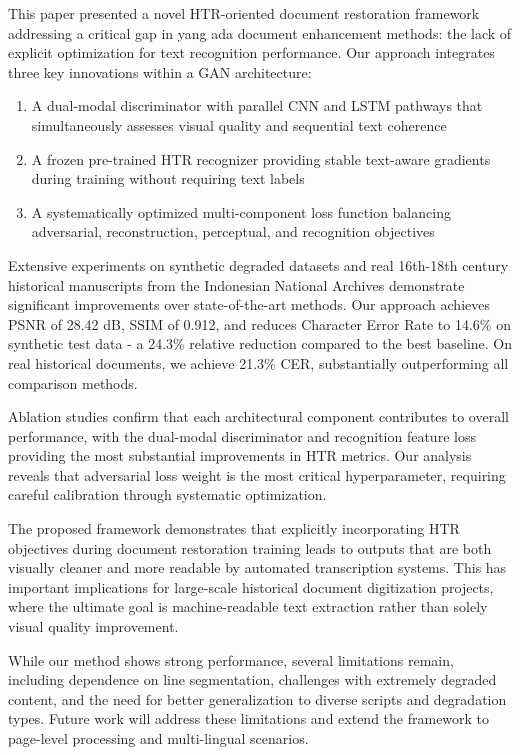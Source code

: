 \documentclass[journal]{IEEEtran}
\begin{document}
This paper presented a novel HTR-oriented document restoration framework addressing a critical gap in yang ada document enhancement methods: the lack of explicit optimization for text recognition performance. Our approach integrates three key innovations within a GAN architecture:

\begin{enumerate}
    \item A dual-modal discriminator with parallel CNN and LSTM pathways that simultaneously assesses visual quality and sequential text coherence
    \item A frozen pre-trained HTR recognizer providing stable text-aware gradients during training without requiring text labels
    \item A systematically optimized multi-component loss function balancing adversarial, reconstruction, perceptual, and recognition objectives
\end{enumerate}

Extensive experiments on synthetic degraded datasets and real 16th-18th century historical manuscripts from the Indonesian National Archives demonstrate significant improvements over state-of-the-art methods. Our approach achieves PSNR of 28.42 dB, SSIM of 0.912, and reduces Character Error Rate to 14.6\% on synthetic test data - a 24.3\% relative reduction compared to the best baseline. On real historical documents, we achieve 21.3\% CER, substantially outperforming all comparison methods.

Ablation studies confirm that each architectural component contributes to overall performance, with the dual-modal discriminator and recognition feature loss providing the most substantial improvements in HTR metrics. Our analysis reveals that adversarial loss weight is the most critical hyperparameter, requiring careful calibration through systematic optimization.

The proposed framework demonstrates that explicitly incorporating HTR objectives during document restoration training leads to outputs that are both visually cleaner and more readable by automated transcription systems. This has important implications for large-scale historical document digitization projects, where the ultimate goal is machine-readable text extraction rather than solely visual quality improvement.

While our method shows strong performance, several limitations remain, including dependence on line segmentation, challenges with extremely degraded content, and the need for better generalization to diverse scripts and degradation types. Future work will address these limitations and extend the framework to page-level processing and multi-lingual scenarios.
\end{document}
